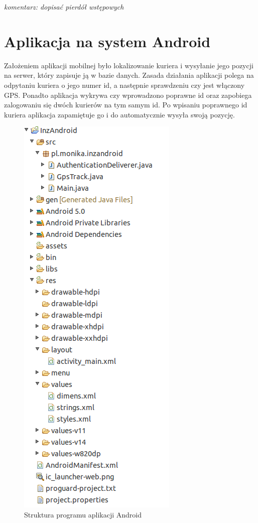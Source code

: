 \documentclass[eng,printmode,oneside]{mgr}
\begin{document}
\emph{\color{komentarz} komentarz: dopisać pierdół wstępowych}

\newpage
\section{Aplikacja na system Android}

Założeniem aplikacji mobilnej było lokalizowanie kuriera i wysyłanie jego
pozycji na serwer, który zapisuje ją w bazie danych. Zasada działania aplikacji
polega na odpytaniu kuriera o jego numer id, a następnie sprawdzeniu czy jest
włączony GPS. Ponadto aplikacja wykrywa czy wprowadzono poprawne id oraz
zapobiega zalogowaniu się dwóch kurierów na tym samym id. Po wpisaniu poprawnego
id kuriera aplikacja zapamiętuje go i do automatycznie wysyła swoją pozycję.

\begin{figure}
\centering
\captionsetup{justification=centering,margin=0cm}
\begin{center}
\includegraphics[width=.3\textwidth]{struktura_android.png}
\end{center}
\caption{Struktura programu aplikacji Android}
\label{fig:androidStruktura}
\end{figure}
\end{document}
